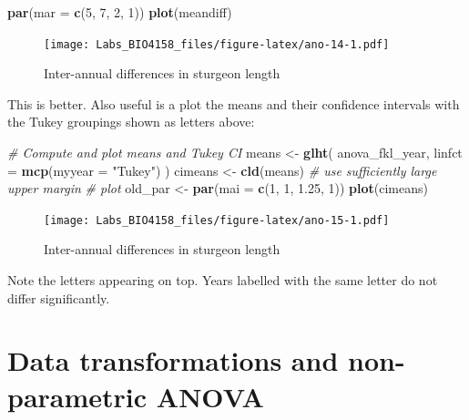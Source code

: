 \documentclass[
  12pt,
]{book}
\newenvironment{Shaded}{\begin{snugshade}}{\end{snugshade}}
\newcommand{\CommentTok}[1]{\textcolor[rgb]{0.56,0.35,0.01}{\textit{#1}}}
\newcommand{\DataTypeTok}[1]{\textcolor[rgb]{0.13,0.29,0.53}{#1}}
\newcommand{\DecValTok}[1]{\textcolor[rgb]{0.00,0.00,0.81}{#1}}
\newcommand{\FloatTok}[1]{\textcolor[rgb]{0.00,0.00,0.81}{#1}}
\newcommand{\KeywordTok}[1]{\textcolor[rgb]{0.13,0.29,0.53}{\textbf{#1}}}
\newcommand{\NormalTok}[1]{#1}
\newcommand{\StringTok}[1]{\textcolor[rgb]{0.31,0.60,0.02}{#1}}
\begin{document}
\begin{Shaded}
\begin{Highlighting}[]
\KeywordTok{par}\NormalTok{(}\DataTypeTok{mar =} \KeywordTok{c}\NormalTok{(}\DecValTok{5}\NormalTok{, }\DecValTok{7}\NormalTok{, }\DecValTok{2}\NormalTok{, }\DecValTok{1}\NormalTok{))}
\KeywordTok{plot}\NormalTok{(meandiff)}
\end{Highlighting}
\end{Shaded}

\begin{figure}
\centering
\texttt{[image: Labs\_BIO4158\_files/figure-latex/ano-14-1.pdf]}
\caption{\label{fig:ano-14}Inter-annual differences in sturgeon length}
\end{figure}

This is better. Also useful is a plot the means and their confidence intervals with the Tukey groupings shown as letters above:

\begin{Shaded}
\begin{Highlighting}[]
\CommentTok{\# Compute and plot means and Tukey CI}
\NormalTok{means \textless{}{-}}\StringTok{ }\KeywordTok{glht}\NormalTok{(}
\NormalTok{  anova\_fkl\_year,}
  \DataTypeTok{linfct =} \KeywordTok{mcp}\NormalTok{(}\DataTypeTok{myyear =} \StringTok{"Tukey"}\NormalTok{)}
\NormalTok{)}
\NormalTok{cimeans \textless{}{-}}\StringTok{ }\KeywordTok{cld}\NormalTok{(means)}
\CommentTok{\# use sufficiently large upper margin}
\CommentTok{\# plot}
\NormalTok{old\_par \textless{}{-}}\StringTok{ }\KeywordTok{par}\NormalTok{(}\DataTypeTok{mai =} \KeywordTok{c}\NormalTok{(}\DecValTok{1}\NormalTok{, }\DecValTok{1}\NormalTok{, }\FloatTok{1.25}\NormalTok{, }\DecValTok{1}\NormalTok{))}
\KeywordTok{plot}\NormalTok{(cimeans)}
\end{Highlighting}
\end{Shaded}

\begin{figure}
\centering
\texttt{[image: Labs\_BIO4158\_files/figure-latex/ano-15-1.pdf]}
\caption{\label{fig:ano-15}Inter-annual differences in sturgeon length}
\end{figure}

Note the letters appearing on top. Years labelled with the same letter do not differ significantly.

\hypertarget{data-transformations-and-non-parametric-anova}{%
\section{Data transformations and non-parametric ANOVA}\label{data-transformations-and-non-parametric-anova}}
\end{document}
